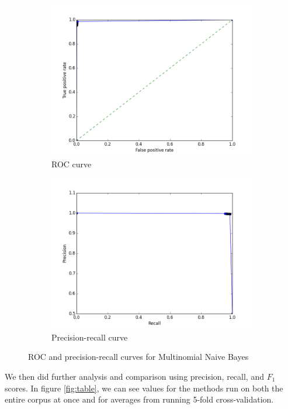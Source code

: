 \documentclass{article} %
\begin{document}
\begin{figure}[h]
  \centering
  \begin{subfigure}{0.35\textwidth}
    \includegraphics[width=\textwidth]{images/naive_bayes_roc_curve.png}
    \caption{ROC curve}
  \end{subfigure}
  \begin{subfigure}{0.35\textwidth}
    \includegraphics[width=\textwidth]{images/naive_bayes_pr_curve.png}
    \caption{Precision-recall curve}
  \end{subfigure}
  \caption{ROC and precision-recall curves for Multinomial Naive Bayes}
  \label{fig:nb}
\end{figure}

We then did further analysis and comparison using precision, recall, and $F_1$ scores. In figure \ref{fig:table}, we can see values for the methods run on both the entire corpus at once and for averages from running 5-fold cross-validation. 
\end{document}
